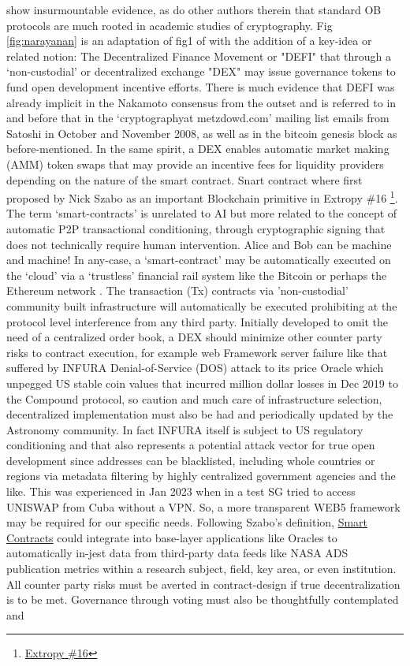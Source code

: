 \documentclass[final,5p,times,twocolumn,authoryear]{elsarticle}
\begin{document}
\cite{arvindandclark2017} show insurmountable evidence, as do other authors therein that standard OB protocols are much rooted in academic studies of cryptography. Fig \ref{fig:narayanan} is an adaptation of fig1 of \citet{arvindandclark2017} with the addition of a key-idea or related notion: The Decentralized Finance Movement or "DEFI" that through a `non-custodial' or decentralized exchange "DEX" may issue governance tokens to fund open development incentive efforts. There is much evidence that DEFI was already implicit in the Nakamoto consensus from the outset and is referred to in \cite{nak2009} and before that in the `cryptographyat metzdowd.com' mailing list emails from Satoshi in October and November 2008, as well as in the bitcoin genesis block as before-mentioned. In the same spirit, a DEX enables automatic market making (AMM) token swaps that may provide an incentive fees for liquidity providers depending on the nature of the smart contract. Snart contract where first proposed by Nick Szabo as an important Blockchain primitive in Extropy \#16 \footnote{\href{ https://archive.org/details/extropy-16}{Extropy \#16}}. The term `smart-contracts' is unrelated to AI but more related to the concept of automatic P2P transactional conditioning, through cryptographic signing that does not technically require human intervention. Alice and Bob can be machine and machine!  In any-case, a `smart-contract' may be automatically executed on the `cloud' via a `trustless' financial rail system like the Bitcoin or perhaps the Ethereum network \citep{antono_me19}. The transaction (Tx) contracts via 'non-custodial' community built infrastructure will automatically be executed prohibiting at the protocol level interference from any third party. Initially developed to omit the need of a centralized order book, a DEX should minimize other counter party risks to contract execution, for example web Framework server failure like that suffered by INFURA Denial-of-Service (DOS) attack to its price Oracle which unpegged US stable coin values that incurred million dollar losses in Dec 2019 to the Compound protocol, so caution and much care of infrastructure selection, decentralized implementation must also be had and periodically updated by the Astronomy community. In fact INFURA itself is subject to US regulatory conditioning and that also represents a potential attack vector for true open development since addresses can be blacklisted, including whole countries or regions via metadata filtering by highly centralized government agencies and the like. This was experienced in Jan 2023 when in a test SG tried to access UNISWAP from Cuba without a VPN. So, a more transparent WEB5 framework may be required for our specific needs. Following Szabo's definition, \href{https://www.fon.hum.uva.nl/rob/Courses/InformationInSpeech/CDROM/Literature/LOTwinterschool2006/szabo.best.vwh.net/smart.contracts.html}{Smart Contracts} could integrate into base-layer applications like Oracles to automatically in-jest data from third-party data feeds like NASA ADS publication metrics within a research subject, field, key area,  or even institution. All counter party risks must be averted in contract-design if true decentralization is to be met. Governance through voting must also be thoughtfully contemplated and 
\end{document}
